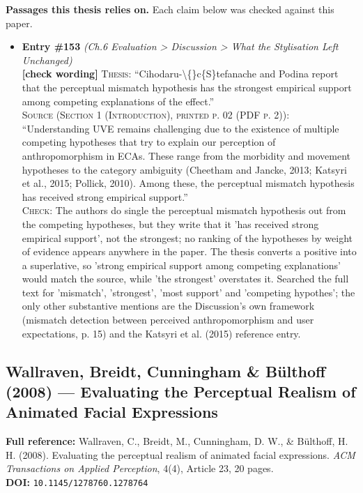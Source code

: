 \documentclass[11pt, a4paper]{article}
\begin{document}
\textbf{Passages this thesis relies on.} Each claim below was checked against this paper.
\begin{itemize}[leftmargin=1.2em,itemsep=4pt]
\item \textbf{Entry \#153} \textit{(Ch.6 Evaluation > Discussion > What the Stylisation Left Unchanged)}\\
\textcolor{partialorange}{\textbf{[check wording]}} \textsc{Thesis:} ``Cihodaru-\textbackslash\{\}c\{S\}tefanache and Podina report that the perceptual mismatch hypothesis has the strongest empirical support among competing explanations of the effect.''\\
\textsc{Source (Section 1 (Introduction), printed p. 02 (PDF p. 2)):} ``Understanding UVE remains challenging due to the existence of multiple competing hypotheses that try to explain our perception of anthropomorphism in ECAs. These range from the morbidity and movement hypotheses to the category ambiguity (Cheetham and Jancke, 2013; Katsyri et al., 2015; Pollick, 2010). Among these, the perceptual mismatch hypothesis has received strong empirical support.''\\
\textsc{Check:} The authors do single the perceptual mismatch hypothesis out from the competing hypotheses, but they write that it 'has received strong empirical support', not the strongest; no ranking of the hypotheses by weight of evidence appears anywhere in the paper. The thesis converts a positive into a superlative, so 'strong empirical support among competing explanations' would match the source, while 'the strongest' overstates it. Searched the full text for 'mismatch', 'strongest', 'most support' and 'competing hypothes'; the only other substantive mentions are the Discussion's own framework (mismatch detection between perceived anthropomorphism and user expectations, p. 15) and the Katsyri et al. (2015) reference entry.
\end{itemize}

\vspace{8pt}
\subsection{Wallraven, Breidt, Cunningham \& Bülthoff (2008) --- Evaluating the Perceptual Realism of Animated Facial Expressions}

\begin{refbox}
\textbf{Full reference:} Wallraven, C., Breidt, M., Cunningham, D. W., \& Bülthoff, H. H. (2008). Evaluating the perceptual realism of animated facial expressions. \textit{ACM Transactions on Applied Perception}, 4(4), Article 23, 20 pages.\\[4pt]
\textbf{DOI:} \texttt{10.1145/1278760.1278764}
\end{refbox}
\end{document}

